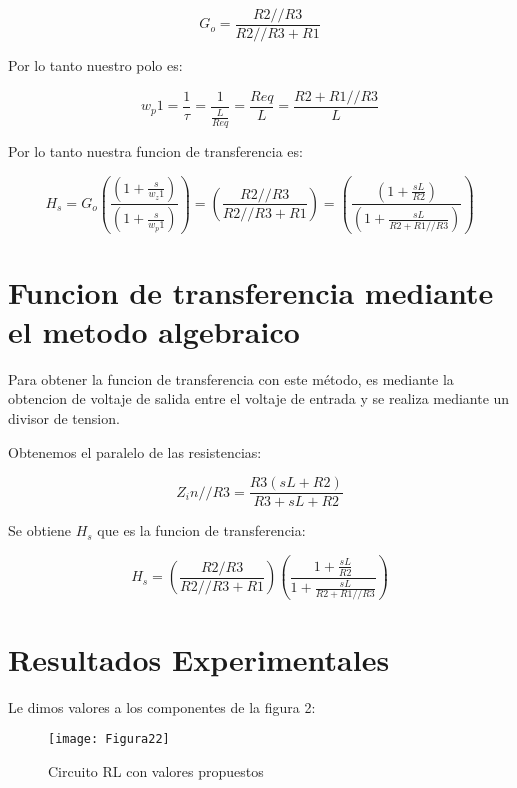 \documentclass{report}
\newcounter{ns}
\begin{document}
	\begin{equation*}
		G_o= \frac{R2//R3}{R2//R3+R1}
	\end{equation*}
	
	Por lo tanto nuestro polo es:
	
	\begin{equation*}
		w_p1=\frac{1}{\tau}=\frac{1}{\frac{L}{Req}}=\frac{Req}{L}=\frac{R2+R1//R3}{L}
	\end{equation*}
	
	Por lo tanto nuestra funcion de transferencia es:
	
	\begin{equation*}
		H_s=G_o\left(\frac{\left(1+\frac{s}{w_z1}\right)}{\left(1+\frac{s}{w_p1}\right)}\right)=\left(\frac{R2//R3}{R2//R3+R1}\right)=\left(\frac{\left(1+\frac{sL}{R2}\right)}{\left(1+\frac{sL}{R2+R1//R3}\right)}\right)
	\end{equation*}	
	
	\section*{Funcion de transferencia mediante el metodo algebraico}
	
	Para obtener la funcion de transferencia con este método, es mediante la obtencion de voltaje de salida entre el voltaje de entrada y se realiza mediante un divisor de tension.
	
	Obtenemos el paralelo de las resistencias:
	
	\begin{equation*}
		Z_in//R3 =\frac{R3(sL+R2)}{R3+sL+R2}
	\end{equation*}
	
	
	Se obtiene $H_s$ que es la funcion de transferencia:
	
	\begin{equation*}
		H_s= \left(\frac{R2/R3}{R2//R3+R1}\right)\left(\frac{1+\frac{sL}{R2}}{1+\frac{sL}{R2+R1//R3}}\right)
	\end{equation*}
	
	\newpage
	\section*{Resultados Experimentales}	
	
	Le dimos valores a los componentes de la figura 2:
	
	\begin{figure}[H]
		\centering
		\texttt{[image: Figura22]}
		\caption{Circuito RL con valores propuestos}
		\label{fig:figura100}
	\end{figure}
\end{document}
